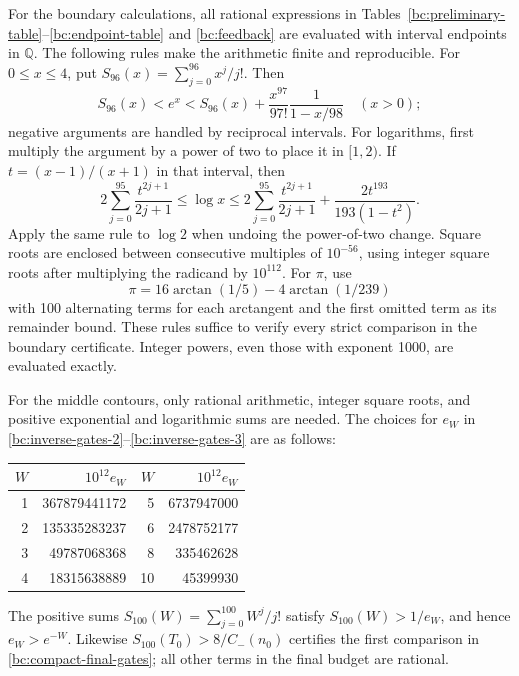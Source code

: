 For the boundary calculations, all rational expressions in
Tables~\ref{bc:preliminary-table}--\ref{bc:endpoint-table} and
\eqref{bc:feedback} are evaluated with interval endpoints in $\mathbb Q$.
The following rules make the arithmetic finite and reproducible.
For $0\leq x\leq4$, put $S_{96}(x)=\sum_{j=0}^{96}x^j/j!$.
Then
\[
 S_{96}(x)<e^x<
 S_{96}(x)+\frac{x^{97}}{97!}\frac1{1-x/98}
 \quad(x>0);
\]
negative arguments are handled by reciprocal intervals.
For logarithms, first multiply the argument by a power of two to
place it in $[1,2)$.  If $t=(x-1)/(x+1)$ in that interval, then
\[
 2\sum_{j=0}^{95}\frac{t^{2j+1}}{2j+1}
 \leq\log x\leq
 2\sum_{j=0}^{95}\frac{t^{2j+1}}{2j+1}
 +\frac{2t^{193}}{193(1-t^2)}.
\]
Apply the same rule to $\log2$ when undoing the power-of-two change.
Square roots are enclosed between consecutive multiples of $10^{-56}$,
using integer square roots after multiplying the radicand by $10^{112}$.
For $\pi$, use
\[
 \pi=16\arctan(1/5)-4\arctan(1/239)
\]
with 100 alternating terms for each arctangent and the first omitted
term as its remainder bound.  These rules suffice to verify every
strict comparison in the boundary certificate.  Integer powers, even
those with exponent 1000, are evaluated exactly.

For the middle contours, only rational arithmetic, integer square
roots, and positive exponential and logarithmic sums are needed.
The choices for $e_W$ in \eqref{bc:inverse-gates-2}--\eqref{bc:inverse-gates-3}
are as follows:
\begin{center}\small
\begin{tabular}{@{}rrrr@{}}\toprule
$W$&$10^{12}e_W$&$W$&$10^{12}e_W$\\\midrule
1&367879441172&5&6737947000\\
2&135335283237&6&2478752177\\
3&49787068368&8&335462628\\
4&18315638889&10&45399930\\\bottomrule
\end{tabular}
\end{center}
The positive sums $S_{100}(W)=\sum_{j=0}^{100}W^j/j!$ satisfy
$S_{100}(W)>1/e_W$, and hence $e_W>e^{-W}$.
Likewise $S_{100}(T_0)>8/C_-(n_0)$ certifies the first comparison
in \eqref{bc:compact-final-gates}; all other terms in the final
budget are rational.

